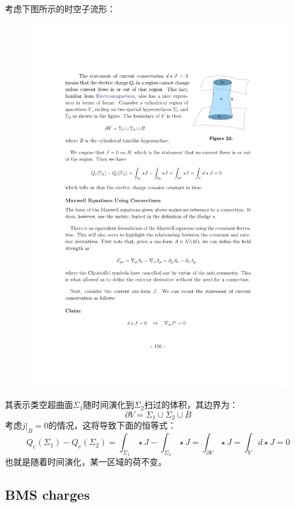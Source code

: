 考虑下图所示的时空子流形：
\begin{figure}[H]
	\centering
	\includegraphics{figs/fig5.pdf}
\end{figure}
\noindent 其表示类空超曲面$\Sigma_1$随时间演化到$\Sigma_2$扫过的体积，其边界为：
\[\partial V=\Sigma_1\cup\Sigma_2\cup B\]
考虑$j|_B=0$的情况，这将导致下面的恒等式：
\begin{equation}
	Q_e(\Sigma_1)-Q_e(\Sigma_2)=\int_{\Sigma_1}\star J-\int_{\Sigma_2}\star J=\int_{\partial V}\star J=\int_Vd\star J=0
\end{equation}
也就是随着时间演化，某一区域的荷不变。
\subsection{BMS charges}
